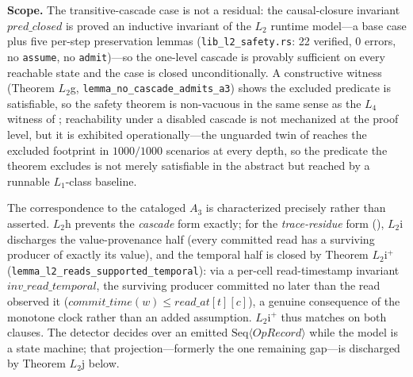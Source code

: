 \documentclass[journal,compsoc,10pt]{IEEEtran}
\theoremstyle{definition}
\theoremstyle{remark}
\begin{document}
\medskip
\noindent\textbf{Scope.}
The transitive-cascade case is not a residual: the causal-closure
invariant $\mathit{pred\_closed}$ is proved an inductive invariant of
the $L_2$ runtime model---a base case plus five per-step preservation
lemmas (\texttt{lib\_l2\_safety.rs}: 22 verified, 0 errors, no
\texttt{assume}, no \texttt{admit})---so the one-level cascade is
provably sufficient on every reachable state and the case is closed
unconditionally. A constructive witness (Theorem $L_2$g,
\texttt{lemma\_no\_cascade\_admits\_a3}) shows the excluded predicate
is satisfiable, so the safety theorem is non-vacuous in the same sense
as the $L_4$ witness of ; reachability under a
disabled cascade is not mechanized at the proof level, but it is
exhibited operationally---the unguarded twin of 
reaches the excluded footprint in $1000/1000$ scenarios at every depth,
so the predicate the theorem excludes is not merely satisfiable in the
abstract but reached by a runnable $L_1$-class baseline.

The correspondence to the cataloged $A_3$ is characterized precisely
rather than asserted. $L_2$h prevents the \emph{cascade} form exactly; for
the \emph{trace-residue} form (), $L_2$i discharges the
value-provenance half (every committed read has a surviving producer of
exactly its value), and the temporal half is closed by Theorem $L_2$i$^+$
(\texttt{lemma\_l2\_reads\_supported\_temporal}): via a per-cell
read-timestamp invariant $\mathit{inv\_read\_temporal}$, the surviving
producer committed no later than the read observed it
($\mathit{commit\_time}(w)\le\mathit{read\_at}[t][c]$), a genuine
consequence of the monotone clock rather than an added assumption. $L_2$i$^+$
thus matches  on both clauses. The detector decides over an
emitted $\mathrm{Seq}\langle\mathit{OpRecord}\rangle$ while the model is a
state machine; that projection---formerly the one remaining gap---is
discharged by Theorem $L_2$j below.
\end{document}
